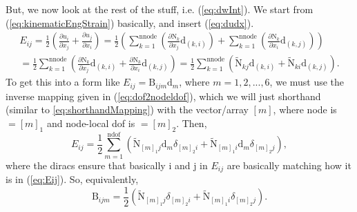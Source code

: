 \documentclass[12pt,a4paper]{article}
\theoremstyle{remark} %
\numberwithin{equation}{section} %
\begin{document}
But, we now look at the rest of the stuff, i.e. (\ref{eq:dwInt}). We start from (\ref{eq:kinematicEngStrain}) basically, and insert (\ref{eq:dudx}).
\begin{align} \label{eq:Eij}
	E_{ij} = \frac{1}{2} \left( \frac{\partial u_i}{\partial x_j} + \frac{\partial u_j}{\partial x_i} \right)
	= \frac{1}{2} \left( \sum_{k = 1}^{\text{nnode}}(\frac{\partial \mathrm N_k}{\partial x_j} \mathrm d_{(k, i)}) + \sum_{k = 1}^{\text{nnode}}(\frac{\partial \mathrm N_k}{\partial x_i} \mathrm d_{(k, j)}) \right) \nonumber \\
	= \frac{1}{2} \sum_{k = 1}^{\text{nnode}} \left( \frac{\partial \mathrm N_k}{\partial x_j} \mathrm d_{(k, i)} + \frac{\partial \mathrm N_k}{\partial x_i} \mathrm d_{(k, j)} \right)
	= \frac{1}{2} \sum_{k = 1}^{\text{nnode}} \left( \mathrm{\tilde N}_{kj} \mathrm d_{(k, i)} + \mathrm{\tilde N}_{ki} \mathrm d_{(k, j)} \right) .
\end{align}
To get this into a form like $E_{ij} = \mathrm B_{ijm} \mathrm d_m$, where $m = 1, 2, ..., 6$, we must use the inverse mapping given in (\ref{eq:dof2nodeldof}), which we will just shorthand (similar to \ref{eq:shorthandMapping}) with the vector/array $[m]$, where node is $= [m]_1$ and node-local dof is $= [m]_2$. Then,
\begin{equation}
	E_{ij} = \frac{1}{2} \sum_{m = 1}^{\text{ndof}} \left( \mathrm{\tilde N}_{[m]_1 j} \mathrm d_m \delta_{[m]_2 i} + \mathrm{\tilde N}_{[m]_1 i} \mathrm d_m \delta_{[m]_2 j} \right) ,
\end{equation}
where the diracs ensure that basically i and j in $E_{ij}$ are basically matching how it is in (\ref{eq:Eij}). So, equivalently,
\begin{equation}
	\mathrm B_{ijm} = \frac{1}{2} \left( \mathrm{\tilde N}_{[m]_1 j} \delta_{[m]_2 i} + \mathrm{\tilde N}_{[m]_1 i} \delta_{[m]_2 j} \right) .
\end{equation}
\end{document}
